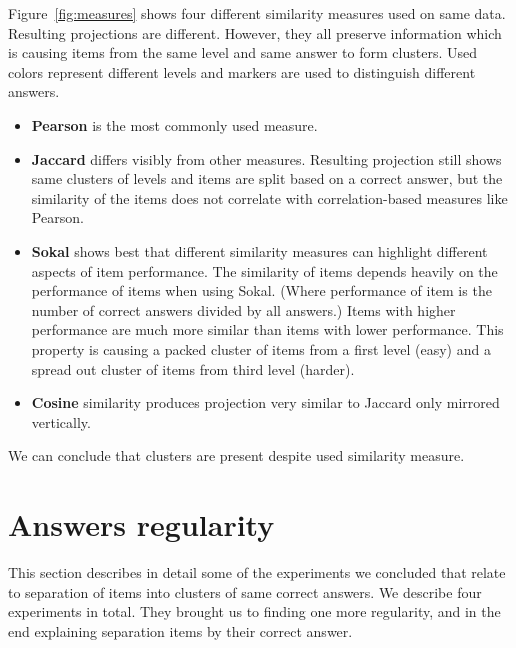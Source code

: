 \documentclass[
  printed, %
  table,   %
  nolof,     %
  nolot,     %
  color,
  final,
  nocover
]{fithesis3}
\begin{document}
Figure~\ref{fig:measures} shows four different similarity measures used on same data. Resulting projections are different. However, they all preserve information which is causing items from the same level and same answer to form clusters. Used colors represent different levels and markers are used to distinguish different answers.


\begin{itemize}
\item
  \textbf{Pearson} is the most commonly used measure.

\item
  \textbf{Jaccard} differs visibly from other measures. Resulting projection still shows same clusters of levels and items are split based on a correct answer, but the similarity of the items does not correlate with correlation-based measures like Pearson.

\item
  \textbf{Sokal} shows best that different similarity measures can highlight different aspects of item performance. The similarity of items depends heavily on the performance of items when using Sokal. (Where performance of item is the number of correct answers divided by all answers.) Items with higher performance are much more similar than items with lower performance. This property is causing a packed cluster of items from a first level (easy) and a spread out cluster of items from third level (harder).

\item
  \textbf{Cosine} similarity produces projection very similar to Jaccard only mirrored vertically.
\end{itemize}

We can conclude that clusters are present despite used similarity measure.


\section{Answers regularity}\label{evaulation-answers-regularity}

This section describes in detail some of the experiments we concluded that relate to separation of items into clusters of same correct answers. We describe four experiments in total. They brought us to finding one more regularity, and in the end explaining separation items by their correct answer.
\end{document}
